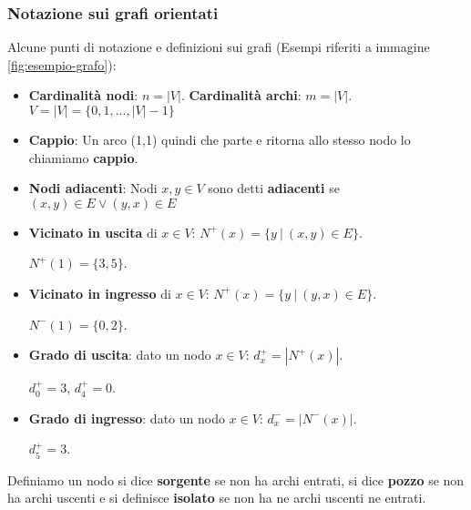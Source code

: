 \subsubsection{Notazione sui grafi orientati}
Alcune punti di notazione e definizioni sui grafi (Esempi riferiti a immagine \ref{fig:esempio-grafo}):
\begin{itemize}
    \item \textbf{Cardinalità nodi}: $n = |V|$. \hspace{.5cm} \textbf{Cardinalità archi}: $m = |V|$. \hspace{.5cm} $V = |V| = \{0,1,..., |V|-1\}$
    \item \textbf{Cappio}: Un arco (1,1) quindi che parte e ritorna allo stesso nodo lo chiamiamo \textbf{cappio}.
    \item \textbf{Nodi adiacenti}: Nodi $x,y \in V$ sono detti \textbf{adiacenti} se $(x,y) \in E \lor (y,x) \in E$
    \item \textbf{Vicinato in uscita} di $x \in V$: \hspace{.7cm} $N^+(x) = \{y \: | \: (x,y) \in E\}$.
    \begin{example}
        $N^+(1) = \{3,5\}$.
    \end{example}
    \item \textbf{Vicinato in ingresso} di $x \in V$: \hspace{.7cm} $N^+(x) = \{y \: | \: (y,x) \in E\}$.
    \begin{example}
        $N^-(1) = \{0,2\}$.
    \end{example}
    \item \textbf{Grado di uscita}: dato un nodo $x \in V$: \hspace{.7cm} $d^+_x = |N^+(x)|$.
    \begin{example}
        $d^+_0 = 3$, $d^+_4 = 0$.
    \end{example}
    \item \textbf{Grado di ingresso}: dato un nodo $x \in V$: \hspace{.7cm} $d^-_x = |N^-(x)|$.
    \begin{example}
        $d^+_5 = 3$.
    \end{example}
\end{itemize}

\begin{definition}
    Definiamo un nodo si dice \textbf{sorgente} se non ha archi entrati, si dice \textbf{pozzo} se non ha archi uscenti e si definisce \textbf{isolato} se non ha ne archi uscenti ne entrati.
\end{definition}

